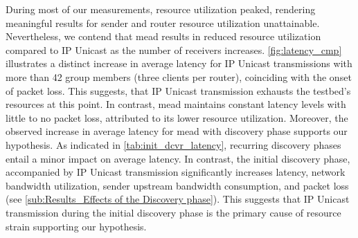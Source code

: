 \begin{itemize}
    During most of our measurements, resource utilization peaked,
        rendering meaningful results for sender and router resource utilization
        unattainable.
    Nevertheless, we contend that \gls{mead} results in reduced resource
        utilization compared to IP Unicast as the number of receivers increases.
    \autoref{fig:latency_cmp} illustrates a distinct increase in average
        latency for IP Unicast transmissions with more than 42 group members
        (three clients per router), coinciding with the onset of packet loss.
    This suggests, that IP Unicast transmission exhausts the testbed's
        resources at this point.
    In contrast, \gls{mead} maintains constant latency levels with little to no
        packet loss, attributed to its lower resource utilization.
    Moreover, the observed increase in average latency for \gls{mead} with
        discovery phase supports our hypothesis.
    As indicated in \autoref{tab:init_dcvr_latency}, recurring discovery phases
        entail a minor impact on average latency.
    In contrast, the initial discovery phase, accompanied by IP Unicast
        transmission significantly increases latency, network bandwidth utilization,
        sender upstream bandwidth consumption, and packet loss (see
        \autoref{sub:Results_Effects of the Discovery phase}).
    This suggests that IP Unicast transmission during the initial discovery
        phase is the primary cause of resource strain supporting our hypothesis.


\end{itemize}
